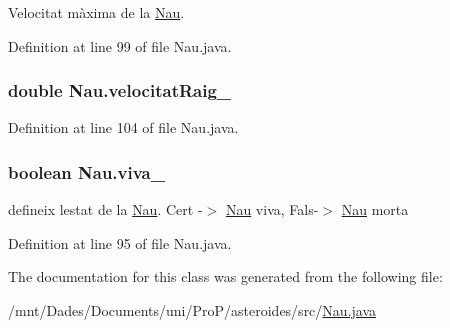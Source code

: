 Velocitat màxima de la \hyperlink{class_nau}{Nau}. 



Definition at line 99 of file Nau.\+java.

\hypertarget{class_nau_a1400505da3bafa2056c8e542a7811b33}{}
\subsubsection[{velocitat\+Raig\+\_\+}]{\setlength{\rightskip}{0pt plus 5cm}double Nau.\+velocitat\+Raig\+\_\+\hspace{0.3cm}{\ttfamily [protected]}}\label{class_nau_a1400505da3bafa2056c8e542a7811b33}


Definition at line 104 of file Nau.\+java.

\hypertarget{class_nau_a165d7613744bb71f472d6bc56aa65540}{}
\subsubsection[{viva\+\_\+}]{\setlength{\rightskip}{0pt plus 5cm}boolean Nau.\+viva\+\_\+\hspace{0.3cm}{\ttfamily [private]}}\label{class_nau_a165d7613744bb71f472d6bc56aa65540}


defineix l\textquotesingle{}estat de la \hyperlink{class_nau}{Nau}. Cert -\/$>$ \hyperlink{class_nau}{Nau} viva, Fals-\/$>$ \hyperlink{class_nau}{Nau} morta 



Definition at line 95 of file Nau.\+java.



The documentation for this class was generated from the following file\+:\begin{DoxyCompactItemize}
\item 
/mnt/\+Dades/\+Documents/uni/\+Pro\+P/asteroides/src/\hyperlink{_nau_8java}{Nau.\+java}\end{DoxyCompactItemize}
